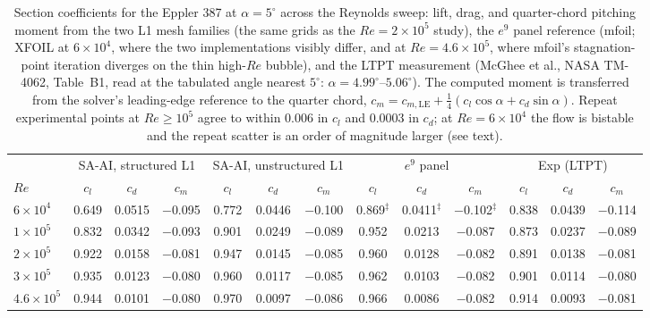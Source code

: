 \documentclass[journal]{new-aiaa}
\begin{document}
\begin{table}[tp]
  \centering
  \small
  \setlength{\tabcolsep}{4.5pt}
  \caption{Section coefficients for the Eppler 387 at $\alpha\!=\!5^\circ$
  across the Reynolds sweep: lift, drag, and quarter-chord pitching moment from
  the two L1 mesh families (the same grids as the $Re\!=\!2\!\times\!10^5$
  study), the $e^9$ panel reference (mfoil; XFOIL at $6\!\times\!10^4$,
  where the two implementations visibly differ, and at
  $Re\!=\!4.6\!\times\!10^5$, where mfoil's stagnation-point iteration
  diverges on the thin high-$Re$ bubble), and the LTPT measurement
  (McGhee et al., NASA TM-4062,
  Table~B1, read at the tabulated angle nearest $5^\circ$:
  $\alpha\!=\!4.99^\circ$--$5.06^\circ$). The computed moment is transferred
  from the solver's leading-edge reference to the quarter chord,
  $c_m\!=\!c_{m,\mathrm{LE}}+\tfrac14(c_l\cos\alpha+c_d\sin\alpha)$. Repeat
  experimental points at $Re\!\geq\!10^5$ agree to within $0.006$ in $c_l$ and
  $0.0003$ in $c_d$; at $Re\!=\!6\!\times\!10^4$ the flow is bistable and the
  repeat scatter is an order of magnitude larger (see text).}
  \label{tab:eppresweep}
  \begin{tabular}{l ccc ccc ccc ccc}
    \toprule
    & \multicolumn{3}{c}{SA-AI, structured L1} & \multicolumn{3}{c}{SA-AI, unstructured L1}
    & \multicolumn{3}{c}{$e^9$ panel} & \multicolumn{3}{c}{Exp (LTPT)}\\
    \cmidrule(lr){2-4}\cmidrule(lr){5-7}\cmidrule(lr){8-10}\cmidrule(lr){11-13}
    $Re$ & $c_l$ & $c_d$ & $c_m$ & $c_l$ & $c_d$ & $c_m$ & $c_l$ & $c_d$ & $c_m$ & $c_l$ & $c_d$ & $c_m$ \\
    \midrule
    $6\!\times\!10^4$   & 0.649 & 0.0515 & $-$0.095 & 0.772 & 0.0446 & $-$0.100 & 0.869$^\ddagger$ & 0.0411$^\ddagger$ & $-$0.102$^\ddagger$ & 0.838 & 0.0439 & $-$0.114 \\
    $1\!\times\!10^5$   & 0.832 & 0.0342 & $-$0.093 & 0.901 & 0.0249 & $-$0.089 & 0.952 & 0.0213 & $-$0.087 & 0.873 & 0.0237 & $-$0.089 \\
    $2\!\times\!10^5$   & 0.922 & 0.0158 & $-$0.081 & 0.947 & 0.0145 & $-$0.085 & 0.960 & 0.0128 & $-$0.082 & 0.891 & 0.0138 & $-$0.081 \\
    $3\!\times\!10^5$   & 0.935 & 0.0123 & $-$0.080 & 0.960 & 0.0117 & $-$0.085 & 0.962 & 0.0103 & $-$0.082 & 0.901 & 0.0114 & $-$0.080 \\
    $4.6\!\times\!10^5$ & 0.944 & 0.0101 & $-$0.080 & 0.970 & 0.0097 & $-$0.086 & 0.966 & 0.0086 & $-$0.082 & 0.914 & 0.0093 & $-$0.081 \\

\end{tabular}
\end{table}
\end{document}
